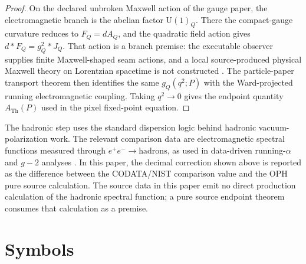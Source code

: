 \documentclass[11pt]{article}
\theoremstyle{remark}
\newcommand{\U}{\mathrm{U}}
\newcommand{\ATh}{A_{\mathrm{Th}}}
\begin{document}
\begin{proof}
On the declared unbroken Maxwell action of the gauge paper, the electromagnetic branch is the
abelian factor \(\U(1)_Q\). There the compact-gauge curvature reduces to \(F_Q=dA_Q\), and the
quadratic field action gives \(d{*}F_Q=g_Q^2{*}J_Q\). That action is a branch premise: the
executable observer supplies finite Maxwell-shaped seam actions, and a local source-produced
physical Maxwell theory on Lorentzian spacetime is not constructed \cite{ophpostdiction}. The particle-paper transport theorem then identifies
the same \(g_Q(q^2;P)\) with the Ward-projected running electromagnetic coupling. Taking
\(q^2\to0\) gives the endpoint quantity \(\ATh(P)\) used in the pixel fixed-point equation.
\end{proof}

The hadronic step uses the standard dispersion logic behind hadronic vacuum-polarization work. The relevant comparison data are electromagnetic spectral functions measured through \(e^+e^-\to\mathrm{hadrons}\), as used in data-driven running-\(\alpha\) and \(g-2\) analyses \cite{dhmz,knt19,pdg-xsect}. In this paper, the decimal correction shown above is reported as the difference between the CODATA/NIST comparison value and the OPH pure source calculation. The source data in this paper emit no direct production calculation of the hadronic spectral function; a pure source endpoint theorem consumes that calculation as a premise.

\clearpage
\section{Symbols}
\end{document}
